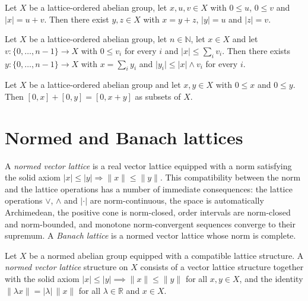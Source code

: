 \begin{theorem}
\label{thm:exists-abs-decomposition}
\leanok
{}
Let $X$ be a lattice-ordered abelian group, let $x, u, v \in X$ with
$0 \le u$, $0 \le v$ and $\lvert x \rvert = u + v$. Then there exist
$y, z \in X$ with $x = y + z$, $\lvert y \rvert = u$ and
$\lvert z \rvert = v$.
\end{theorem}

\begin{theorem}
\label{thm:riesz-decomposition-abs}
\leanok
{}
Let $X$ be a lattice-ordered abelian group, let $n \in \mathbb{N}$, let
$x \in X$ and let $v : \{0, \dots, n-1\} \to X$ with $0 \le v_i$ for
every $i$ and $\lvert x \rvert \le \sum_i v_i$. Then there exists
$y : \{0, \dots, n-1\} \to X$ with $x = \sum_i y_i$ and
$\lvert y_i \rvert \le \lvert x \rvert \wedge v_i$ for every $i$.
\end{theorem}

\begin{theorem}
\label{thm:Icc-add-Icc-of-nonneg}
\leanok
{}
Let $X$ be a lattice-ordered abelian group and let $x, y \in X$ with
$0 \le x$ and $0 \le y$. Then
$[0, x] + [0, y] = [0, x + y]$
as subsets of $X$.
\end{theorem}

\section{Normed and Banach lattices}

A \emph{normed vector lattice} is a real vector lattice equipped with a
norm satisfying the solid axiom $\lvert x \rvert \le \lvert y \rvert
\Rightarrow \lVert x \rVert \le \lVert y \rVert$. This compatibility
between the norm and the lattice operations has a number of immediate
consequences: the lattice operations $\vee$, $\wedge$ and
$\lvert \cdot \rvert$ are norm-continuous, the space is automatically
Archimedean, the positive cone is norm-closed, order intervals are
norm-closed and norm-bounded, and monotone norm-convergent sequences
converge to their supremum. A \emph{Banach lattice} is a normed vector
lattice whose norm is complete.

\begin{definition}
\label{def:normed-vector-lattice}
\leanok
{}
Let $X$ be a normed abelian group equipped with a compatible lattice
structure. A \emph{normed vector lattice} structure on $X$ consists of
a vector lattice structure together with the solid axiom
$\lvert x \rvert \le \lvert y \rvert \implies \lVert x \rVert \le
\lVert y \rVert$ for all $x, y \in X$, and the identity $\lVert
\lambda x \rVert = \lvert \lambda \rvert \, \lVert x \rVert$ for all
$\lambda \in \mathbb{R}$ and $x \in X$.
\end{definition}

